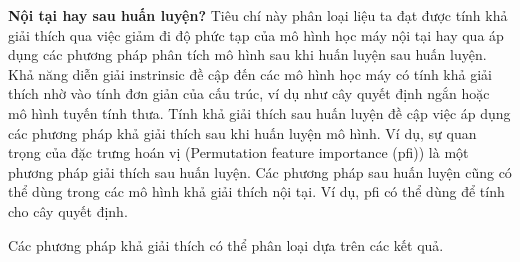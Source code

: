 \textbf{Nội tại hay sau huấn luyện?} Tiêu chí này phân loại liệu ta đạt được tính khả giải thích qua việc giảm đi độ phức tạp của mô hình học máy nội tại hay qua áp dụng các phương pháp phân tích mô hình sau khi huấn luyện sau huấn luyện. Khả năng diễn giải instrinsic đề cập đến các mô hình học máy có tính khả giải thích nhờ vào tính đơn giản của cấu trúc, ví dụ như cây quyết định ngắn hoặc mô hình tuyến tính thưa. Tính khả giải thích sau huấn luyện đề cập việc áp dụng các phương pháp khả giải thích sau khi huấn luyện mô hình. Ví dụ, sự quan trọng của đặc trưng hoán vị (Permutation feature importance (pfi)) là một phương pháp giải thích sau huấn luyện. Các phương pháp sau huấn luyện cũng có thể dùng trong các mô hình khả giải thích nội tại. Ví dụ, pfi có thể dùng để tính cho cây quyết định. 

Các phương pháp khả giải thích có thể phân loại dựa trên các kết quả.

